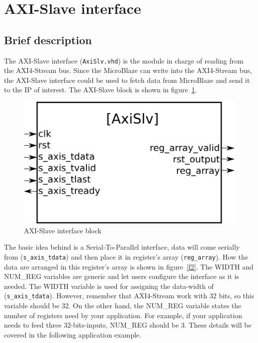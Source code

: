 \section{AXI-Slave interface}

\subsection{Brief description}

The AXI-Slave interface ({\tt AxiSlv.vhd}) is the module in charge of reading from the AXI4-Stream bus. Since the MicroBlaze can write into the AXI4-Stream bus, the AXI-Slave interface could be used to fetch data from MicroBlaze and send it to the IP of interest. The AXI-Slave block is shown in figure~\ref{f1}.

\begin{figure}[!h]
\includegraphics[scale=0.25]{images/axiSlvBlock.png}
\caption{AXI-Slave interface block}
\label{f1}
\end{figure}

The basic idea behind is a Serial-To-Parallel interface, data will come serially from ({\tt s\_axis\_tdata}) and then place it in register's array ({\tt reg\_array}). How the data are arranged in this register's array is shown in figure~\ref{f2}. The WIDTH and NUM\_REG variables are generic and let users configure the interface as it is needed. The WIDTH variable is used for assigning the data-width of ({\tt s\_axis\_tdata}). However, remember that AXI4-Stream work with $32$ bits, so this variable should be $32$. On the other hand, the NUM\_REG variable states the number of registers need by your application. For example, if your application needs to feed three $32$-bits-inputs, NUM\_REG should be $3$. These details will be covered in the following application example.

